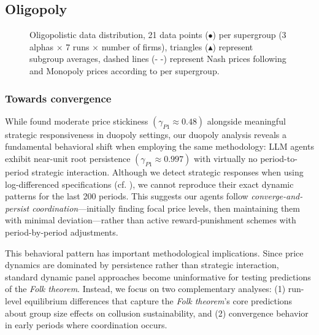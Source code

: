 \subsection*{Oligopoly}



\begin{figure}[H]
    \centering
    
    \caption{Oligopolistic data distribution, 21 data points ($\bullet$) per supergroup (3 alphas $\times$ 7 runs $\times$ number of firms), triangles ($\blacktriangle$) represent subgroup averages, dashed lines ($\text{- -}$) represent Nash prices following  and Monopoly prices according to  per supergroup.}
    \label{fig:oligopols}
\end{figure}



\subsubsection*{Towards convergence}

While \textcite[p. 18]{fish_algorithmic_2025} found moderate price stickiness $(\gamma_{P1} \approx 0.48)$ alongside meaningful strategic responsiveness in duopoly settings, our duopoly analysis reveals a fundamental behavioral shift when employing the same methodology: LLM agents exhibit near-unit root persistence $(\gamma_{P1} \approx 0.997)$ with virtually no period-to-period strategic interaction. Although we detect strategic responses when using log-differenced specifications (cf. ), we cannot reproduce their exact dynamic patterns for the last 200 periods. This suggests our agents follow \emph{converge-and-persist coordination}---initially finding focal price levels, then maintaining them with minimal deviation---rather than active reward-punishment schemes with period-by-period adjustments.

This behavioral pattern has important methodological implications. Since price dynamics are dominated by persistence rather than strategic interaction, standard dynamic panel approaches become uninformative for testing predictions of the \emph{Folk theorem}. Instead, we focus on two complementary analyses: (1) run-level equilibrium differences that capture the \emph{Folk theorem}'s core predictions about group size effects on collusion sustainability, and (2) convergence behavior in early periods where coordination occurs.